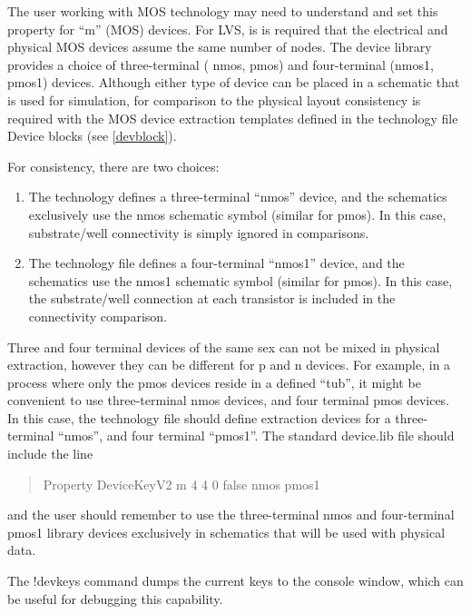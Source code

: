 \begin{description}
The user working with MOS technology may need to understand and set
this property for ``{\vt m}'' (MOS) devices.  For LVS, is is required
that the electrical and physical MOS devices assume the same number of
nodes.  The device library provides a choice of three-terminal ({\cb
nmos}, {\cb pmos}) and four-terminal ({\cb nmos1}, {\cb pmos1})
devices.  Although either type of device can be placed in a schematic
that is used for simulation, for comparison to the physical layout
consistency is required with the MOS device extraction templates
defined in the technology file {\vt Device} blocks (see
\ref{devblock}).

For consistency, there are two choices:
\begin{enumerate}
\item{The technology defines a three-terminal ``nmos'' device, and the
schematics exclusively use the {\cb nmos} schematic symbol (similar
for pmos).  In this case, substrate/well connectivity is simply
ignored in comparisons.}

\item{The technology file defines a four-terminal ``nmos1'' device,
and the schematics use the {\cb nmos1} schematic symbol (similar for
pmos).  In this case, the substrate/well connection at each transistor
is included in the connectivity comparison.}
\end{enumerate}

Three and four terminal devices of the same sex can not be mixed in
physical extraction, however they can be different for p and n
devices.  For example, in a process where only the pmos devices reside
in a defined ``tub'', it might be convenient to use three-terminal
nmos devices, and four terminal pmos devices.  In this case, the
technology file should define extraction devices for a three-terminal
``nmos'', and four terminal ``pmos1''.  The standard {\vt device.lib}
file should include the line

\begin{quote}
\vt Property DeviceKeyV2 m 4 4 0 false nmos pmos1
\end{quote}

and the user should remember to use the three-terminal {\cb nmos} and
four-terminal {\cb pmos1} library devices exclusively in schematics
that will be used with physical data.

The {\cb !devkeys} command dumps the current keys to the console
window, which can be useful for debugging this capability.
\end{description}

